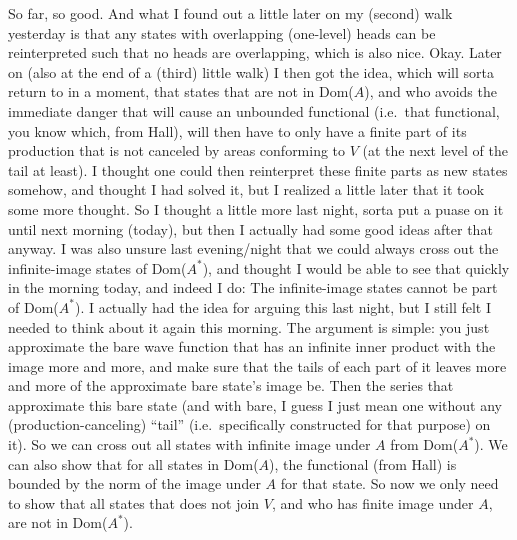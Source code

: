 \documentclass{report}
\begin{document}
So far, so good. And what I found out a little later on my (second) walk yesterday is that any states with overlapping (one-level) heads can be reinterpreted such that no heads are overlapping, which is also nice. Okay. Later on (also at the end of a (third) little walk) I then got the idea, which will sorta return to in a moment, that states that are not in Dom($A$), and who avoids the immediate danger that will cause an unbounded functional (i.e.\ that functional, you know which, from Hall), will then have to only have a finite part of its production that is not canceled by areas conforming to $V$ (at the next level of the tail at least). I thought one could then reinterpret these finite parts as new states somehow, and thought I had solved it, but I realized a little later that it took some more thought. So I thought a little more last night, sorta put a puase on it until next morning (today), but then I actually had some good ideas after that anyway. I was also unsure last evening/night that we could always cross out the infinite-image states of Dom($A^*$), and thought I would be able to see that quickly in the morning today, and indeed I do: The infinite-image states cannot be part of Dom($A^*$). I actually had the idea for arguing this last night, but I still felt I needed to think about it again this morning. The argument is simple: you just approximate the bare wave function that has an infinite inner product with the image more and more, and make sure that the tails of each part of it leaves more and more of the approximate bare state's image be. Then the series that approximate this bare state (and with bare, I guess I just mean one without any (production-canceling) ``tail'' (i.e.\ specifically constructed for that purpose) on it). So we can cross out all states with infinite image under $A$ from Dom($A^*$). We can also show that for all states in Dom($A$), the functional (from Hall) is bounded by the norm of the image under $A$ for that state. So now we only need to show that all states that does not join $V$, and who has finite image under $A$, are not in Dom($A^*$). 
\end{document}

